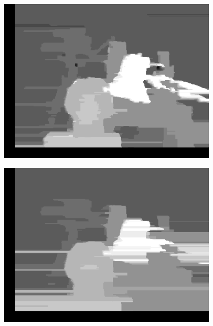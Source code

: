 \documentclass[a4paper]{scrartcl}
\begin{document}
\vspace{1cm}
\begin{minipage}{0.8\textwidth}
  \centering
  \includegraphics[width=0.8\textwidth]{images/scale-0.05.png}
\end{minipage}

\vspace{1cm}
\begin{minipage}{0.8\textwidth}
  \centering
  \includegraphics[width=0.8\textwidth]{images/scale-0.5.png}
\end{minipage}
\end{document}
